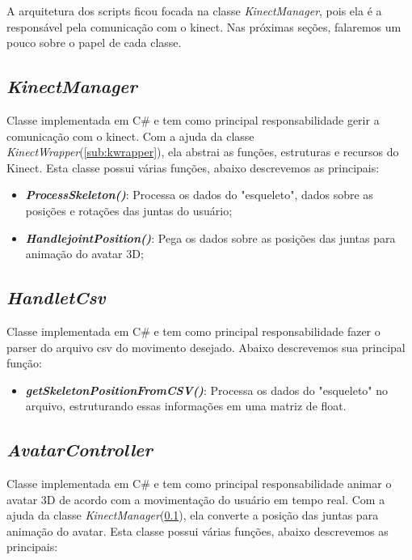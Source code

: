   A arquitetura dos scripts ficou focada na classe \textit{KinectManager}, pois ela é a responsável pela comunicação com o kinect.
Nas próximas seções, falaremos um pouco sobre o papel de cada classe.

\subsection{\textit{KinectManager}}\label{sub:kmanager}
  Classe implementada em C\# e tem como principal responsabilidade gerir a comunicação com o kinect. Com a ajuda da classe \textit{KinectWrapper}(\ref{sub:kwrapper}), ela
  abstrai as funções, estruturas e recursos do Kinect. Esta classe possui várias funções, abaixo descrevemos as principais:

  \begin{itemize}
      \item \textit{\textbf{ProcessSkeleton()}}: Processa os dados do "esqueleto", dados sobre as posições e rotações das juntas do usuário;
      \item \textit{\textbf{HandlejointPosition()}}: Pega os dados sobre as posições das juntas para animação do avatar 3D;

  \end{itemize}

\subsection{\textit{HandletCsv}}\label{sub:getcsv}
  Classe implementada em C\# e tem como principal responsabilidade fazer o parser do arquivo csv do movimento desejado. Abaixo descrevemos sua principal função:

  \begin{itemize}
      \item \textit{\textbf{getSkeletonPositionFromCSV()}}: Processa os dados do "esqueleto" no arquivo, estruturando essas informações em uma matriz de float.
  \end{itemize}

\subsection{\textit{AvatarController}}\label{sub:avatarc}
  Classe implementada em C\# e tem como principal responsabilidade animar o avatar 3D de acordo com a movimentação do usuário em tempo real. Com a ajuda da classe \textit{KinectManager}(\ref{sub:kmanager}), ela
  converte a posição das juntas para animação do avatar. Esta classe possui várias funções, abaixo descrevemos as principais:

